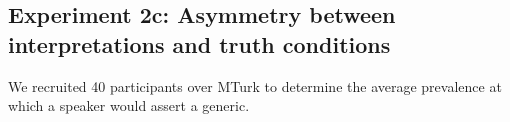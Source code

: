 \documentclass{pnastwo}
\begin{document}
\begin{article}
\begin{materials}

\subsection{Experiment 2c: Asymmetry between interpretations and truth conditions}
%
%
%
We recruited 40 participants over MTurk to determine the average prevalence at which a speaker would assert a generic.  

\end{materials}
\end{article}
\end{document}
